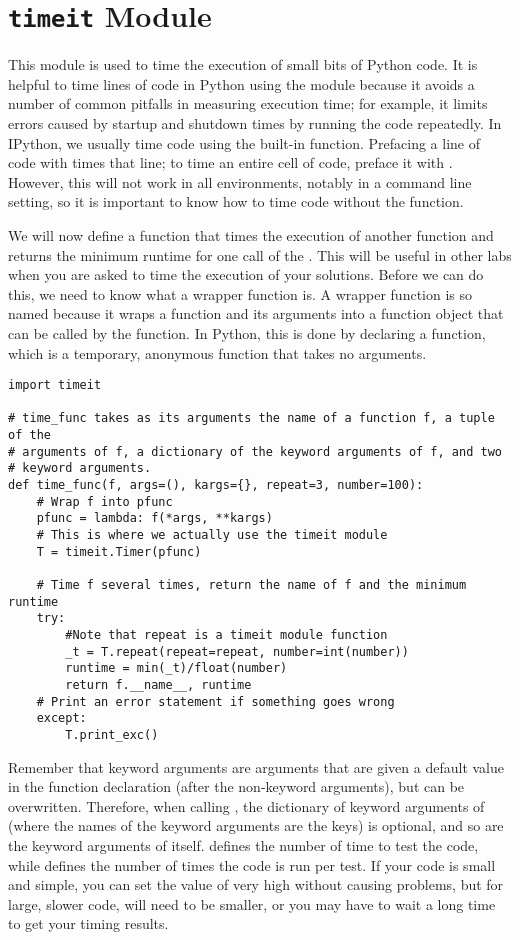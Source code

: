 \section*{\texttt{timeit} Module}
This module is used to time the execution of small bits of Python code.
It is helpful to time lines of code in Python using the  module because it avoids a number of common pitfalls in measuring execution time; for example, it limits errors caused by startup and shutdown times by running the code repeatedly. In IPython, we usually time code using the built-in  function. Prefacing a line of code with  times that line; to time an entire cell of code, preface it with . However, this will not work in all environments, notably in a command line setting, so it is important to know how to time code without the  function.

We will now define a function that times the execution of another function  and returns the minimum runtime for one call of the . This will be useful in other labs when you are asked to time the execution of your solutions. Before we can do this, we need to know what a wrapper function is. A wrapper function is so named because it wraps a function and its arguments into a function object that can be called by the  function. In Python, this is done by declaring a  function, which is a temporary, anonymous function that takes no arguments.

\begin{lstlisting}
import timeit

# time_func takes as its arguments the name of a function f, a tuple of the
# arguments of f, a dictionary of the keyword arguments of f, and two 
# keyword arguments.
def time_func(f, args=(), kargs={}, repeat=3, number=100):
	# Wrap f into pfunc
	pfunc = lambda: f(*args, **kargs)
	# This is where we actually use the timeit module
	T = timeit.Timer(pfunc)

	# Time f several times, return the name of f and the minimum runtime
	try:
		#Note that repeat is a timeit module function
		_t = T.repeat(repeat=repeat, number=int(number))
		runtime = min(_t)/float(number)
		return f.__name__, runtime
	# Print an error statement if something goes wrong
	except:
		T.print_exc()
\end{lstlisting}

Remember that keyword arguments are arguments that are given a default value in the function declaration (after the non-keyword arguments), but can be overwritten. Therefore, when calling , the dictionary of keyword arguments of  (where the names of the keyword arguments are the keys) is optional, and so are the keyword arguments of  itself.
 defines the number of time to test the code, while  defines the number of times the code is run per test. If your code is small and simple, you can set the value of  very high without causing problems, but for large, slower code,  will need to be smaller, or you may have to wait a long time to get your timing results.

